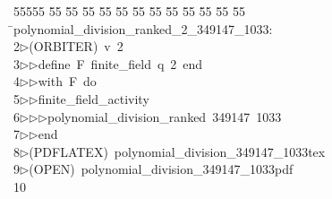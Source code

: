 %
%
\begin{tabbing}
55555 \= 55 \= 55 \= 55 \= 55 \= 55 \= 55 \= 55 \= 55 \= 55 \= 55 \= 55 \= 55 \= \>polynomial\_division\_ranked\_2\_349147\_1033:\\[0pt]
2\>$\triangleright$\>(ORBITER)\ v\ 2\ \\[0pt]
3\>$\triangleright$\>$\triangleright$\>define\ F\ finite\_field\ q\ 2\ end\ \\[0pt]
4\>$\triangleright$\>$\triangleright$\>with\ F\ do\ \\[0pt]
5\>$\triangleright$\>$\triangleright$\>finite\_field\_activity\ \\[0pt]
6\>$\triangleright$\>$\triangleright$\>$\triangleright$\>polynomial\_division\_ranked\ 349147\ 1033\ \\[0pt]
7\>$\triangleright$\>$\triangleright$\>end\\[0pt]
8\>$\triangleright$\>(PDFLATEX)\ polynomial\_division\_349147\_1033tex\\[0pt]
9\>$\triangleright$\>(OPEN)\ polynomial\_division\_349147\_1033pdf\\[0pt]
10\>\end{tabbing}
